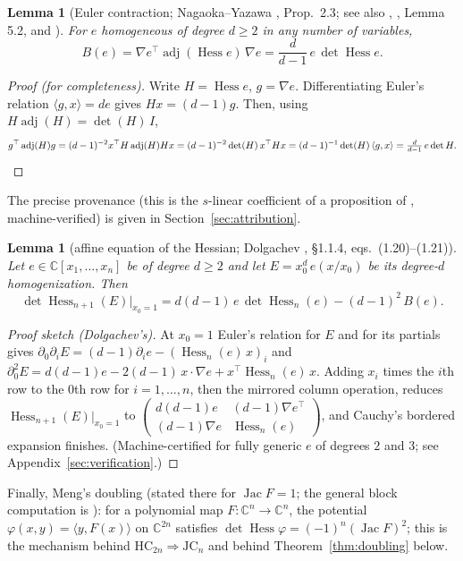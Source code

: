 \documentclass[11pt]{article}
\theoremstyle{plain}
\newtheorem{lemma}[theorem]{Lemma}
\theoremstyle{definition}
\newcommand{\C}{\mathbb{C}}
\newcommand{\Hess}{\operatorname{Hess}}
\newcommand{\adj}{\operatorname{adj}}
\newcommand{\Jac}{\operatorname{Jac}}
\newcommand{\HC}{\mathrm{HC}}
\newcommand{\JC}{\mathrm{JC}}
\begin{document}
\begin{lemma}[Euler contraction; Nagaoka--Yazawa \cite{NY}, Prop.~2.3;
see also \cite{Fox2017}, \cite{DHWZ}, Lemma 5.2, and
\cite{Dolgachev}]\label{lem:identE}
For $e$ homogeneous of degree $d\ge2$ in any number of variables,
\[
B(e)=\nabla e^{\top}\adj(\Hess e)\,\nabla e
=\frac{d}{d-1}\,e\,\det\Hess e .
\]
\end{lemma}

\begin{proof}[Proof (for completeness)]
Write $H=\Hess e$, $g=\nabla e$. Differentiating Euler's relation
$\langle g,x\rangle=de$ gives $Hx=(d-1)g$. Then, using
$H\adj(H)=\det(H)\,I$,
\[
g^{\top}\adj(H)g=(d-1)^{-2}x^{\top}H\adj(H)Hx
=(d-1)^{-2}\det(H)\,x^{\top}Hx
=(d-1)^{-1}\det(H)\,\langle g,x\rangle
=\tfrac{d}{d-1}\,e\det H. \qedhere
\]
\end{proof}

The precise provenance (this is the $s$-linear coefficient of a
proposition of \cite{NY}, machine-verified) is given in
Section~\ref{sec:attribution}.

\begin{lemma}[affine equation of the Hessian; Dolgachev
\cite{Dolgachev}, \S1.1.4, eqs.~(1.20)--(1.21)]\label{lem:identH}
Let $e\in\C[x_1,\dots,x_n]$ be of degree $d\ge2$ and let
$E=x_0^d\,e(x/x_0)$ be its degree-$d$ homogenization. Then
\[
\det\Hess_{n+1}(E)\big|_{x_0=1}
=d(d-1)\,e\,\det\Hess_n(e)-(d-1)^2\,B(e).
\]
\end{lemma}

\begin{proof}[Proof sketch (Dolgachev's)]
At $x_0=1$ Euler's relation for $E$ and for its partials gives
$\partial_0\partial_iE=(d-1)\partial_ie-(\Hess_n(e)\,x)_i$ and
$\partial_0^2E=d(d-1)e-2(d-1)\,x\!\cdot\!\nabla e+x^{\top}\Hess_n(e)\,x$.
Adding $x_i$ times the $i$th row to the $0$th row for $i=1,\dots,n$, then
the mirrored column operation, reduces $\Hess_{n+1}(E)|_{x_0=1}$ to
$\left(\begin{smallmatrix}d(d-1)e&(d-1)\nabla e^{\top}\\
(d-1)\nabla e&\Hess_n(e)\end{smallmatrix}\right)$, and Cauchy's bordered
expansion finishes. (Machine-certified for fully generic $e$ of degrees
$2$ and $3$; see Appendix~\ref{sec:verification}.)
\end{proof}

Finally, Meng's doubling \cite[Prop.~1.4]{Meng2006} (stated there for
$\Jac F=1$; the general block computation is
\cite[Prop.~2.3]{MengYang}): for a polynomial map $F:\C^n\to\C^n$, the
potential $\varphi(x,y)=\langle y,F(x)\rangle$ on $\C^{2n}$ satisfies
$\det\Hess\varphi=(-1)^n(\Jac F)^2$; this is the mechanism behind
$\HC_{2n}\Rightarrow\JC_n$ and behind Theorem~\ref{thm:doubling} below.
\end{document}
